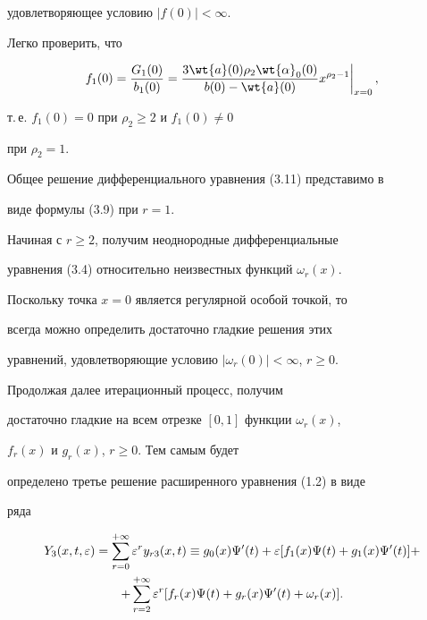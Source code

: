 удовлетворяющее условию $| f(0) | < \infty$.


Легко проверить, что


$$


f_1 (0) = \frac{G_1 (0)}{b_1 (0)} = \frac{3 \wt{a} (0)


\rho_2 \wt{\alpha}_0 (0) }{b (0) - \wt{a}(0)} x^{\rho_2 - 1}


\bigg|_{x= 0}\,,


$$


т.\,е. $ f_1 (0) = 0$ при $\rho_2 \geq 2$ и $f_1 (0) \neq 0$


при $\rho_2 = 1$.





Общее решение дифференциального уравнения (3.11) представимо в


виде формулы (3.9) при $r = 1$.





Начиная с $ r\geq 2$, получим неоднородные дифференциальные


уравнения (3.4) относительно неизвестных функций $\omega_r (x)$.


Поскольку точка $x = 0$ является регулярной особой точкой, то


всегда можно определить достаточно гладкие решения этих


уравнений, удовлетворяющие условию $| \omega_r(0) | <


\infty$, $r\geq 0$.





Продолжая далее итерационный процесс, получим


достаточно гладкие на всем отрезке $[0,1]$ функции $\omega_r(x)$,


$f_r (x)$ и $g_r (x)$, $r\geq 0$. Тем самым будет


определено третье решение расширенного уравнения (1.2) в виде


ряда


\begin{multline}


Y_3 (x, t, \e) =\sum _{r=0}^{+ \infty} \e^r y_{r3} (x,t)


\equiv g_0 (x) \Psi' (t)


+ \e [f_1 (x)\Psi (t) + g_1 (x) \Psi' (t) ]+ \\


%


+ \sum _{r=2}^{+\infty} \e^r [f_r (x)\Psi (t) + g_r (x) \Psi' (t) +


\omega_r (x)].


\end{multline}





